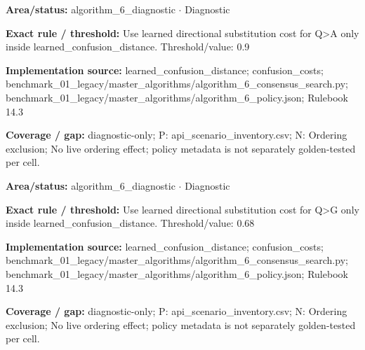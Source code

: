 \begin{tcolorbox}[enhanced,breakable,colback=white,colframe=Muted!45,boxrule=0.45pt,arc=1.5pt,left=6pt,right=6pt,top=5pt,bottom=5pt,title={\texttt{A6-LEARNED-SUBSTITUTION-Q-A}},title after break={\texttt{A6-LEARNED-SUBSTITUTION-Q-A}\ (continued)},fonttitle=\headingfont\bfseries\color{Navy},coltitle=Navy]
\textbf{Area/status:} algorithm\_\allowbreak{}6\_\allowbreak{}diagnostic $\boldsymbol{\cdot}$ Diagnostic\par
\smallskip
\textbf{Exact rule / threshold:} Use learned directional substitution cost for Q>A only inside learned\_\allowbreak{}confusion\_\allowbreak{}distance. Threshold/\allowbreak{}value: 0.9\par
\smallskip
\textbf{Implementation source:} learned\_\allowbreak{}confusion\_\allowbreak{}distance; confusion\_\allowbreak{}costs; benchmark\_\allowbreak{}01\_\allowbreak{}legacy/\allowbreak{}master\_\allowbreak{}algorithms/\allowbreak{}algorithm\_\allowbreak{}6\_\allowbreak{}consensus\_\allowbreak{}search.py; benchmark\_\allowbreak{}01\_\allowbreak{}legacy/\allowbreak{}master\_\allowbreak{}algorithms/\allowbreak{}algorithm\_\allowbreak{}6\_\allowbreak{}policy.json; Rulebook 14.3\par
\smallskip
\textbf{Coverage / gap:} diagnostic-only; P: api\_\allowbreak{}scenario\_\allowbreak{}inventory.csv; N: Ordering exclusion; No live ordering effect; policy metadata is not separately golden-tested per cell.
\end{tcolorbox}
\begin{tcolorbox}[enhanced,breakable,colback=white,colframe=Muted!45,boxrule=0.45pt,arc=1.5pt,left=6pt,right=6pt,top=5pt,bottom=5pt,title={\texttt{A6-LEARNED-SUBSTITUTION-Q-G}},title after break={\texttt{A6-LEARNED-SUBSTITUTION-Q-G}\ (continued)},fonttitle=\headingfont\bfseries\color{Navy},coltitle=Navy]
\textbf{Area/status:} algorithm\_\allowbreak{}6\_\allowbreak{}diagnostic $\boldsymbol{\cdot}$ Diagnostic\par
\smallskip
\textbf{Exact rule / threshold:} Use learned directional substitution cost for Q>G only inside learned\_\allowbreak{}confusion\_\allowbreak{}distance. Threshold/\allowbreak{}value: 0.68\par
\smallskip
\textbf{Implementation source:} learned\_\allowbreak{}confusion\_\allowbreak{}distance; confusion\_\allowbreak{}costs; benchmark\_\allowbreak{}01\_\allowbreak{}legacy/\allowbreak{}master\_\allowbreak{}algorithms/\allowbreak{}algorithm\_\allowbreak{}6\_\allowbreak{}consensus\_\allowbreak{}search.py; benchmark\_\allowbreak{}01\_\allowbreak{}legacy/\allowbreak{}master\_\allowbreak{}algorithms/\allowbreak{}algorithm\_\allowbreak{}6\_\allowbreak{}policy.json; Rulebook 14.3\par
\smallskip
\textbf{Coverage / gap:} diagnostic-only; P: api\_\allowbreak{}scenario\_\allowbreak{}inventory.csv; N: Ordering exclusion; No live ordering effect; policy metadata is not separately golden-tested per cell.
\end{tcolorbox}

